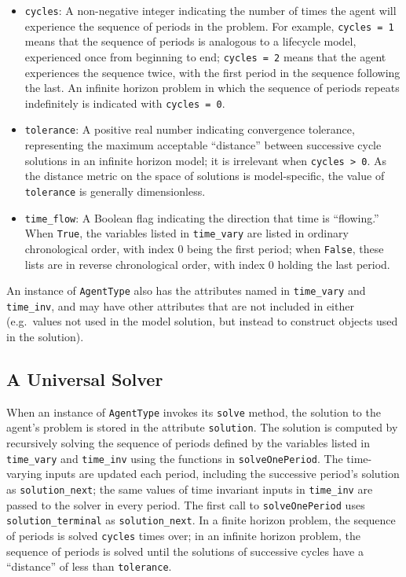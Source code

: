 \documentclass[12pt,titlepage,letterpaper]{econtex}
\begin{document}
{\begin{itemize}
\item \texttt{cycles}: A non-negative integer indicating the number of times the agent will experience the sequence of periods in the problem.  For example, \texttt{cycles = 1} means that the sequence of periods is analogous to a lifecycle model, experienced once from beginning to end; \texttt{cycles = 2} means that the agent experiences the sequence twice, with the first period in the sequence following the last.  An infinite horizon problem in which the sequence of periods repeats indefinitely is indicated with \texttt{cycles = 0}.

\item \texttt{tolerance}: A positive real number indicating convergence tolerance, representing the maximum acceptable ``distance'' between successive cycle solutions in an infinite horizon model; it is irrelevant when \texttt{cycles > 0}.  As the distance metric on the space of solutions is model-specific, the value of \texttt{tolerance} is generally dimensionless.

\item \texttt{time\_flow}: A Boolean flag indicating the direction that time is ``flowing.''  When \texttt{True}, the variables listed in \texttt{time\_vary} are listed in ordinary chronological order, with index 0 being the first period; when \texttt{False}, these lists are in reverse chronological order, with index 0 holding the last period.
\end{itemize}

An instance of \texttt{AgentType} also has the attributes named in \texttt{time\_vary} and \texttt{time\_inv}, and may have other attributes that are not included in either (e.g.\  values not used in the model solution, but instead to construct objects used in the solution).

\subsection{A Universal Solver}\label{sec:UniversalSolver}

When an instance of \texttt{AgentType} invokes its \texttt{solve} method, the solution to the agent's problem is stored in the attribute \texttt{solution}.  The solution is computed by recursively solving the sequence of periods defined by the variables listed in \texttt{time\_vary} and \texttt{time\_inv} using the functions in \texttt{solveOnePeriod}.  The time-varying inputs are updated each period, including the successive period's solution as \texttt{solution\_next}; the same values of time invariant inputs in \texttt{time\_inv} are passed to the solver in every period.  The first call to \texttt{solveOnePeriod} uses \texttt{solution\_terminal} as \texttt{solution\_next}.  In a finite horizon problem, the sequence of periods is solved \texttt{cycles} times over; in an infinite horizon problem, the sequence of periods is solved until the solutions of successive cycles have a ``distance'' of less than \texttt{tolerance}.

}
\end{document}
